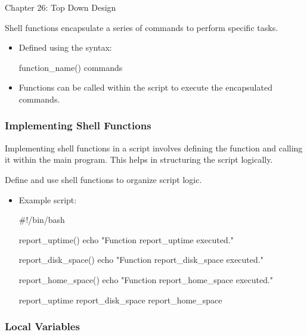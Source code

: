 \begin{notes}{Chapter 26: Top Down Design}
    \begin{highlight}
    
    Shell functions encapsulate a series of commands to perform specific tasks.
    
    \begin{itemize}
        \item Defined using the syntax:
    \begin{code}[Shell]
    function_name() {
        commands
    }
    \end{code}
        \item Functions can be called within the script to execute the encapsulated commands.
    \end{itemize}
    
    \end{highlight}
    
    \subsubsection*{Implementing Shell Functions}
    
    Implementing shell functions in a script involves defining the function and calling it within the main program. This helps in structuring the script logically.
    
    \begin{highlight}
    
    Define and use shell functions to organize script logic.
    
    \begin{itemize}
        \item Example script:
    \begin{code}[Shell]
    #!/bin/bash
    
    report_uptime() {
        echo "Function report_uptime executed."
    }
    
    report_disk_space() {
        echo "Function report_disk_space executed."
    }
    
    report_home_space() {
        echo "Function report_home_space executed."
    }
    
    report_uptime
    report_disk_space
    report_home_space
    \end{code}
    \end{itemize}
    
    \end{highlight}
    
    \subsubsection*{Local Variables}
    

\end{notes}
